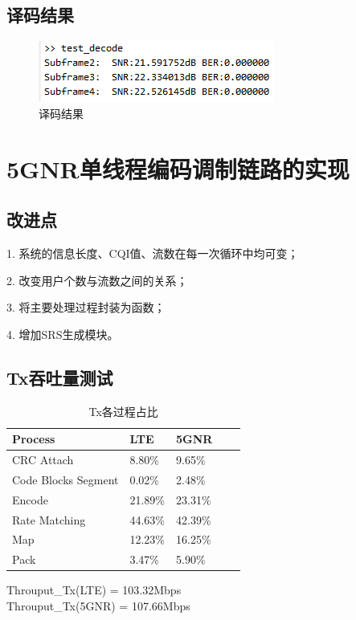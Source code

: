\documentclass{article}
\begin{document}
\subsection{译码结果}
\begin{figure}[H]
	\centering
	\includegraphics[width = .8\textwidth]{res.png}
	\caption{译码结果}
\end{figure}

\section{5GNR单线程编码调制链路的实现}
\subsection{改进点}
1. 系统的信息长度、CQI值、流数在每一次循环中均可变；

2. 改变用户个数与流数之间的关系；

3. 将主要处理过程封装为函数；

4. 增加SRS生成模块。

\subsection{Tx吞吐量测试}
\begin{table}[H]
	\caption{Tx各过程占比}
	\centering
	\begin{tabular}{|l|l|l|l|l|}%
		\hline  %
		Process				& LTE		& 5GNR		\\
		\hline
		CRC Attach			& 8.80\%	& 9.65\%	\\
		\hline
		Code Blocks Segment	& 0.02\%	& 2.48\%	\\
		\hline
		Encode				& 21.89\%	& 23.31\%	\\
		\hline
		Rate Matching		& 44.63\%	& 42.39\%	\\
		\hline
		Map					& 12.23\%	& 16.25\%	\\
		\hline
		Pack				& 3.47\%	& 5.90\%	\\
		\hline  %
	\end{tabular}
\end{table}
Throuput\_Tx(LTE) = 103.32Mbps\\
Throuput\_Tx(5GNR) = 107.66Mbps
\end{document}
